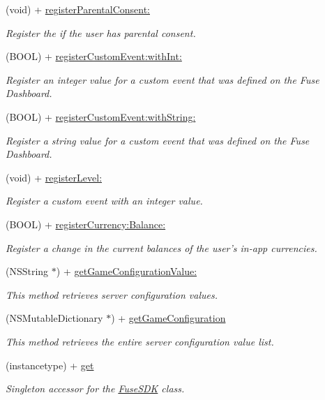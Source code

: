 \begin{DoxyCompactItemize}
(void) + \hyperlink{interface_fuse_s_d_k_ada39e47884f25fc5e6bb1a0acf1831db}{register\+Parental\+Consent\+:}
\begin{DoxyCompactList}\small\item\em Register the if the user has parental consent. \end{DoxyCompactList}\item 
(B\+O\+O\+L) + \hyperlink{interface_fuse_s_d_k_a5ad914282112a76cdb9a0692803b4b38}{register\+Custom\+Event\+:with\+Int\+:}
\begin{DoxyCompactList}\small\item\em Register an integer value for a custom event that was defined on the Fuse Dashboard. \end{DoxyCompactList}\item 
(B\+O\+O\+L) + \hyperlink{interface_fuse_s_d_k_a4ed3ac41f2d30b078c909b2fa03d913a}{register\+Custom\+Event\+:with\+String\+:}
\begin{DoxyCompactList}\small\item\em Register a string value for a custom event that was defined on the Fuse Dashboard. \end{DoxyCompactList}\item 
(void) + \hyperlink{interface_fuse_s_d_k_a37448397d10db8278e2e45d0448c4fa0}{register\+Level\+:}
\begin{DoxyCompactList}\small\item\em Register a custom event with an integer value. \end{DoxyCompactList}\item 
(B\+O\+O\+L) + \hyperlink{interface_fuse_s_d_k_a3321559b952097db1142e04c08da80f0}{register\+Currency\+:\+Balance\+:}
\begin{DoxyCompactList}\small\item\em Register a change in the current balances of the user's in-\/app currencies. \end{DoxyCompactList}\item 
(N\+S\+String $\ast$) + \hyperlink{interface_fuse_s_d_k_ab29213306801eba35d922754a5efa1b0}{get\+Game\+Configuration\+Value\+:}
\begin{DoxyCompactList}\small\item\em This method retrieves server configuration values. \end{DoxyCompactList}\item 
(N\+S\+Mutable\+Dictionary $\ast$) + \hyperlink{interface_fuse_s_d_k_a0267e0bb12395c93cea9442f62dcc53e}{get\+Game\+Configuration}
\begin{DoxyCompactList}\small\item\em This method retrieves the entire server configuration value list. \end{DoxyCompactList}\item 
(instancetype) + \hyperlink{interface_fuse_s_d_k_a01b0d405cef0701ca335624d9910fa6f}{get}
\begin{DoxyCompactList}\small\item\em Singleton accessor for the \hyperlink{interface_fuse_s_d_k}{Fuse\+S\+D\+K} class. \end{DoxyCompactList}\end{DoxyCompactItemize}
